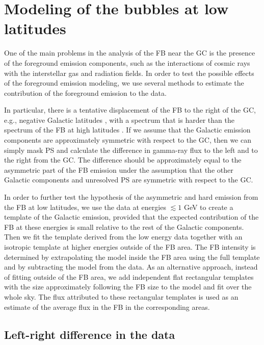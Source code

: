 
\section{Modeling of the \Fermi bubbles at low latitudes}

One of the main problems in the analysis of the FB near the GC is the 
presence of the foreground emission components, 
such as the interactions of cosmic rays with the interstellar gas and radiation fields.
In order to test the possible effects of the foreground emission modeling,
we use several methods to estimate the contribution of the foreground emission to the data.

In particular, there is a tentative
displacement of the FB to the right of the GC, e.g., negative Galactic latitudes \citep{2016ApJS..223...26A, 2017ApJ...840...43A},
with a spectrum that is harder than the spectrum of the FB at high latitudes \citep{2017ApJ...840...43A}.
If we assume that the Galactic emission components are approximately symmetric with respect to the GC,
then we can simply mask PS and calculate the difference in gamma-ray flux to the left and to the right from the GC.
The difference should be approximately equal to the asymmetric part of the FB emission
under the assumption that the other Galactic components and unresolved PS are symmetric with respect to the GC.

In order to further test the hypothesis of the asymmetric and hard emission from the FB at low latitudes,
we use the data at energies $\lesssim 1$ GeV to create a template of the Galactic emission,
provided that the expected contribution of the FB at these energies is small relative to the rest of the Galactic components.
Then we fit the template derived from the low energy data together with an isotropic template at higher energies
outside of the FB area.
The FB intensity is determined by extrapolating the model inside the FB area using the full template and by subtracting the model
from the data.
As an alternative approach, instead of fitting outside of the FB area, we add independent flat rectangular templates with the size
approximately following the FB size to the model and fit over the whole sky.
The flux attributed to these rectangular templates is used as an estimate of the average flux in the FB in the corresponding areas.



\subsection{Left-right difference in the data}

